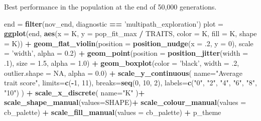 \documentclass[]{book}
\newenvironment{Shaded}{\begin{snugshade}}{\end{snugshade}}
\newcommand{\DataTypeTok}[1]{\textcolor[rgb]{0.13,0.29,0.53}{#1}}
\newcommand{\DecValTok}[1]{\textcolor[rgb]{0.00,0.00,0.81}{#1}}
\newcommand{\FloatTok}[1]{\textcolor[rgb]{0.00,0.00,0.81}{#1}}
\newcommand{\KeywordTok}[1]{\textcolor[rgb]{0.13,0.29,0.53}{\textbf{#1}}}
\newcommand{\NormalTok}[1]{#1}
\newcommand{\OperatorTok}[1]{\textcolor[rgb]{0.81,0.36,0.00}{\textbf{#1}}}
\newcommand{\OtherTok}[1]{\textcolor[rgb]{0.56,0.35,0.01}{#1}}
\newcommand{\StringTok}[1]{\textcolor[rgb]{0.31,0.60,0.02}{#1}}
\begin{document}
Best performance in the population at the end of 50,000 generations.

\begin{Shaded}
\begin{Highlighting}[]
\NormalTok{end =}\StringTok{ }\KeywordTok{filter}\NormalTok{(nov_end, diagnostic }\OperatorTok{==}\StringTok{ 'multipath_exploration'}\NormalTok{)}
\NormalTok{plot =}\StringTok{ }\KeywordTok{ggplot}\NormalTok{(end, }\KeywordTok{aes}\NormalTok{(}\DataTypeTok{x =}\NormalTok{ K, }\DataTypeTok{y =}\NormalTok{ pop_fit_max }\OperatorTok{/}\StringTok{ }\NormalTok{TRAITS, }\DataTypeTok{color =}\NormalTok{ K, }\DataTypeTok{fill =}\NormalTok{ K, }\DataTypeTok{shape =}\NormalTok{ K)) }\OperatorTok{+}
\StringTok{  }\KeywordTok{geom_flat_violin}\NormalTok{(}\DataTypeTok{position =} \KeywordTok{position_nudge}\NormalTok{(}\DataTypeTok{x =} \FloatTok{.2}\NormalTok{, }\DataTypeTok{y =} \DecValTok{0}\NormalTok{), }\DataTypeTok{scale =} \StringTok{'width'}\NormalTok{, }\DataTypeTok{alpha =} \FloatTok{0.2}\NormalTok{) }\OperatorTok{+}
\StringTok{  }\KeywordTok{geom_point}\NormalTok{(}\DataTypeTok{position =} \KeywordTok{position_jitter}\NormalTok{(}\DataTypeTok{width =} \FloatTok{.1}\NormalTok{), }\DataTypeTok{size =} \FloatTok{1.5}\NormalTok{, }\DataTypeTok{alpha =} \FloatTok{1.0}\NormalTok{) }\OperatorTok{+}
\StringTok{  }\KeywordTok{geom_boxplot}\NormalTok{(}\DataTypeTok{color =} \StringTok{'black'}\NormalTok{, }\DataTypeTok{width =} \FloatTok{.2}\NormalTok{, }\DataTypeTok{outlier.shape =} \OtherTok{NA}\NormalTok{, }\DataTypeTok{alpha =} \FloatTok{0.0}\NormalTok{) }\OperatorTok{+}
\StringTok{  }\KeywordTok{scale_y_continuous}\NormalTok{(}
    \DataTypeTok{name=}\StringTok{"Average trait score"}\NormalTok{,}
    \DataTypeTok{limits=}\KeywordTok{c}\NormalTok{(}\OperatorTok{-}\DecValTok{1}\NormalTok{, }\DecValTok{11}\NormalTok{),}
    \DataTypeTok{breaks=}\KeywordTok{seq}\NormalTok{(}\DecValTok{0}\NormalTok{, }\DecValTok{10}\NormalTok{, }\DecValTok{2}\NormalTok{),}
    \DataTypeTok{labels=}\KeywordTok{c}\NormalTok{(}\StringTok{"0"}\NormalTok{, }\StringTok{"2"}\NormalTok{, }\StringTok{"4"}\NormalTok{, }\StringTok{"6"}\NormalTok{, }\StringTok{"8"}\NormalTok{, }\StringTok{"10"}\NormalTok{)}
\NormalTok{  ) }\OperatorTok{+}
\StringTok{  }\KeywordTok{scale_x_discrete}\NormalTok{(}
    \DataTypeTok{name=}\StringTok{"K"}
\NormalTok{  )}\OperatorTok{+}
\StringTok{  }\KeywordTok{scale_shape_manual}\NormalTok{(}\DataTypeTok{values=}\NormalTok{SHAPE)}\OperatorTok{+}
\StringTok{  }\KeywordTok{scale_colour_manual}\NormalTok{(}\DataTypeTok{values =}\NormalTok{ cb_palette) }\OperatorTok{+}
\StringTok{  }\KeywordTok{scale_fill_manual}\NormalTok{(}\DataTypeTok{values =}\NormalTok{ cb_palette) }\OperatorTok{+}
\StringTok{  }\NormalTok{p_theme}


\end{Highlighting}
\end{Shaded}
\end{document}
